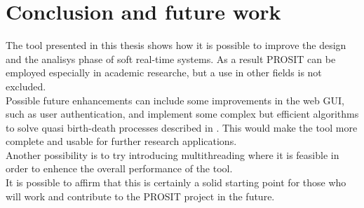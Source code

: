 \chapter{Conclusion and future work}\label{chp:conclusion}


The tool presented in this thesis shows how it is possible to improve the design and the analisys phase of soft real-time systems. As a result PROSIT can be employed especially in academic researche, but a use in other fields is not excluded.\\
Possible future enhancements can include some improvements in the web GUI, such as user authentication, and implement some complex but efficient algorithms to solve quasi birth-death processes described in \cite{futurework}. This would make the tool more complete and usable for further research applications.\\
Another possibility is to try introducing multithreading where it is feasible in order to enhence the overall performance of the tool.\\
It is possible to affirm that this is certainly a solid starting point for those who will work and contribute to the PROSIT project in the future.      